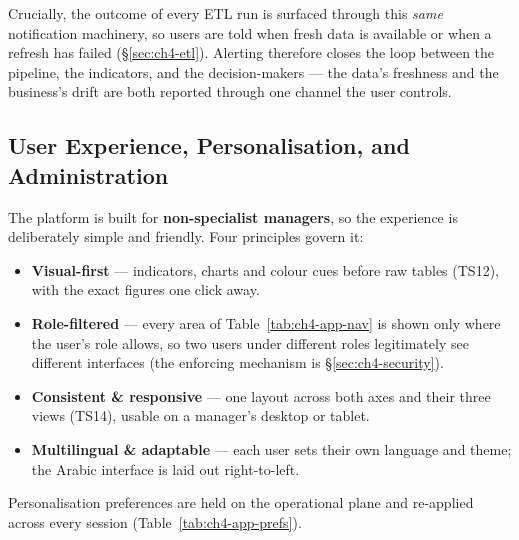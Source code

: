 Crucially, the outcome of every ETL run is surfaced through this \emph{same} notification machinery, so
users are told when fresh data is available or when a refresh has failed (\S\ref{sec:ch4-etl}). Alerting
therefore closes the loop between the pipeline, the indicators, and the decision-makers --- the data's
freshness and the business's drift are both reported through one channel the user controls.

\subsection{User Experience, Personalisation, and Administration}

The platform is built for \textbf{non-specialist managers}, so the experience is deliberately simple and
friendly. Four principles govern it:

\begin{itemize}[noitemsep]
    \item \textbf{Visual-first} --- indicators, charts and colour cues before raw tables (TS12), with the
          exact figures one click away.
    \item \textbf{Role-filtered} --- every area of Table~\ref{tab:ch4-app-nav} is shown only where the
          user's role allows, so two users under different roles legitimately see different interfaces
          (the enforcing mechanism is \S\ref{sec:ch4-security}).
    \item \textbf{Consistent \& responsive} --- one layout across both axes and their three views
          (TS14), usable on a manager's desktop or tablet.
    \item \textbf{Multilingual \& adaptable} --- each user sets their own language and theme; the Arabic
          interface is laid out right-to-left.
\end{itemize}

Personalisation preferences are held on the operational plane and re-applied across every session
(Table~\ref{tab:ch4-app-prefs}).

